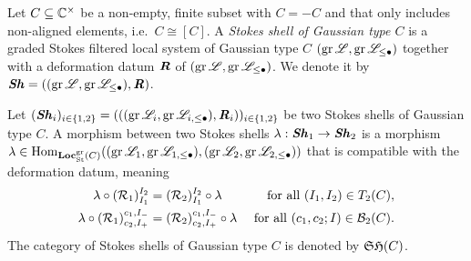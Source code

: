 \begin{defi}\label{defShell} Let $C \subseteq \mathbb{C}^\times$ be a non-empty, finite subset with $C =-C$ and that only includes non-aligned elements, i.e.\ $C \cong [C]$.
    A \emph{Stokes shell of Gaussian type $C$} is a graded Stokes filtered local system of Gaussian type $C$ $(\operatorname{gr}\mathscr{L}, \operatorname{gr} \mathscr{L}_{\leq \bullet})$ together with a deformation datum $\bm{\mathit{R}}$ of $(\operatorname{gr}\mathscr{L}, \operatorname{gr}\mathscr{L}_{\leq \bullet})$. We denote it by $\bm{\mathit{Sh}} =((\operatorname{gr}\mathscr{L},\operatorname{gr}\mathscr{L}_{\leq \bullet}), \bm{\mathit{R}})$.
    
    Let $(\bm{\mathit{Sh}}_i)_{i\in\{1,2\}} = (((\operatorname{gr}\mathscr{L}_i,\operatorname{gr}\mathscr{L}_{i,\leq \bullet}), \bm{\mathit{R}}_i))_{i \in \{1,2\}}$ be two Stokes shells of Gaussian type $C$. A morphism between two Stokes shells $\lambda: \bm{\mathit{Sh}}_1 \to \bm{\mathit{Sh}}_2$ is a morphism $\lambda \in \operatorname{Hom}_{\mathbf{Loc}_{\textrm{St}}^{\operatorname{gr}}(C)}((\operatorname{gr}\mathscr{L}_1,\operatorname{gr}\mathscr{L}_{1,\leq \bullet}), (\operatorname{gr}\mathscr{L}_2,\operatorname{gr}\mathscr{L}_{2,\leq \bullet}))$ that is compatible with the deformation datum, meaning
    \begin{align*}
        \lambda \circ (\mathcal{R}_1)^{I_2}_{I_1} & = (\mathcal{R}_2)^{I_2}_{I_1} \circ \lambda &\text{ for all } (I_1,I_2) \in T_2(C), \\
        \lambda \circ (\mathcal{R}_1)^{c_1,I_-}_{c_2,I_+} & = (\mathcal{R}_2)^{c_1,I_-}_{c_2,I_+} \circ \lambda & \text{ for all }(c_1,c_2;I) \in \mathcal{B}_2(C).
    \end{align*}
    The category of Stokes shells of Gaussian type $C$ is denoted by $\mathfrak{SH}(C)$.
\end{defi}


